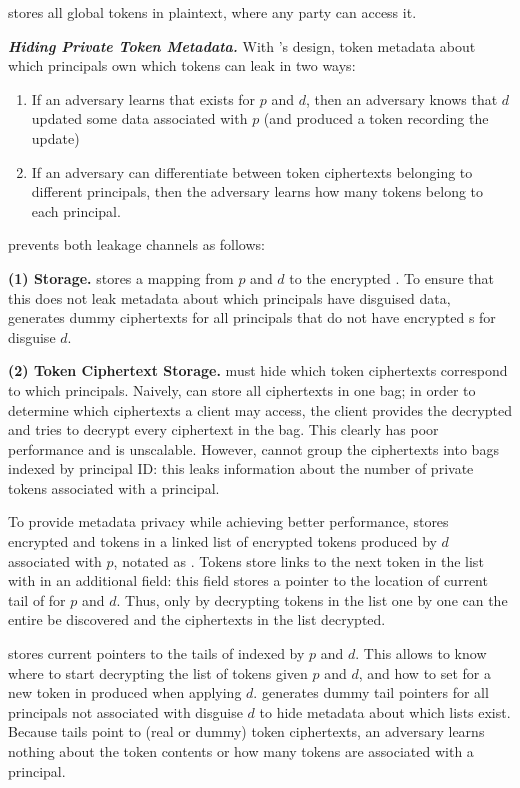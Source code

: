 \sys stores all global  tokens in plaintext, where any party can access it.


\vspace{12pt}
\noindent\textbf{\emph{Hiding Private Token Metadata.}}
With \sys's design, token metadata about which principals own which tokens can leak in two ways:
\begin{enumerate}
    \item If an adversary learns that  exists for $p$ and $d$, 
        then an adversary knows that $d$ updated some data associated with $p$ (and produced a token
        recording the update)
    \item If an adversary can differentiate between token ciphertexts belonging to different
        principals, then the adversary learns how many tokens belong to each principal.
\end{enumerate}

\noindent
\sys prevents both leakage channels as follows:

\vspace{6pt}\noindent\textbf{(1) \symk{} Storage.}
\sys stores a mapping from $p$ and $d$ to the encrypted . To ensure that this does not leak
metadata about which principals have disguised data, \sys generates dummy ciphertexts for all
principals that do not have encrypted s for disguise $d$.

\vspace{6pt}\noindent\textbf{(2) Token Ciphertext Storage.}
\sys must hide which token ciphertexts correspond to which principals.  Naively, \sys can store
all ciphertexts in one bag; in order to determine which ciphertexts a client may access, the client
provides the decrypted  and \sys tries to decrypt every ciphertext in the bag. This clearly
has poor performance and is unscalable.
However, \sys cannot group the ciphertexts into bags indexed by principal ID: this leaks information
about the number of private tokens associated with a principal.

To provide metadata privacy while achieving better performance, \sys stores encrypted  and
 tokens in a linked list of encrypted tokens produced by $d$ associated with $p$, notated
as . 
Tokens store links to the next token in the list with in an additional  field: this
field stores a pointer to the location of current tail of  for $p$ and $d$.
Thus, only by decrypting tokens in the list one by one can the entire  be discovered and
the ciphertexts in the list decrypted.

\sys stores current pointers to the tails of  indexed by $p$ and $d$. This allows \sys to
know where to start decrypting the list of tokens given $p$ and $d$, and how to set
 for a new token in  produced when applying $d$. \sys generates dummy
tail pointers for all principals not associated with disguise $d$ to hide metadata about which lists
exist.
Because  tails point to (real or dummy) token ciphertexts, an adversary learns nothing
about the token contents or how many tokens are associated with a principal.
